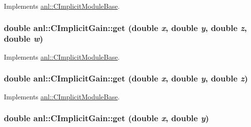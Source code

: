 Implements \hyperlink{classanl_1_1CImplicitModuleBase_aa40b7d54572197612a4fea44b63447eb}{anl::CImplicitModuleBase}.\hypertarget{classanl_1_1CImplicitGain_a2d1715d0d153cc6a6e0a0154484fe90c}{
\subsubsection[{get}]{\setlength{\rightskip}{0pt plus 5cm}double anl::CImplicitGain::get (double {\em x}, \/  double {\em y}, \/  double {\em z}, \/  double {\em w})}}
\label{classanl_1_1CImplicitGain_a2d1715d0d153cc6a6e0a0154484fe90c}


Implements \hyperlink{classanl_1_1CImplicitModuleBase_a3cf520bdab59631864253c03b4e1723f}{anl::CImplicitModuleBase}.\hypertarget{classanl_1_1CImplicitGain_a76cf906f9e4bd4a6346f368951215ca5}{
\subsubsection[{get}]{\setlength{\rightskip}{0pt plus 5cm}double anl::CImplicitGain::get (double {\em x}, \/  double {\em y}, \/  double {\em z})}}
\label{classanl_1_1CImplicitGain_a76cf906f9e4bd4a6346f368951215ca5}


Implements \hyperlink{classanl_1_1CImplicitModuleBase_ac17d592612c82ba3d47f9229a00b1fe3}{anl::CImplicitModuleBase}.\hypertarget{classanl_1_1CImplicitGain_af51697ea592424db9710d58a251b555e}{
\subsubsection[{get}]{\setlength{\rightskip}{0pt plus 5cm}double anl::CImplicitGain::get (double {\em x}, \/  double {\em y})}}
\label{classanl_1_1CImplicitGain_af51697ea592424db9710d58a251b555e}


